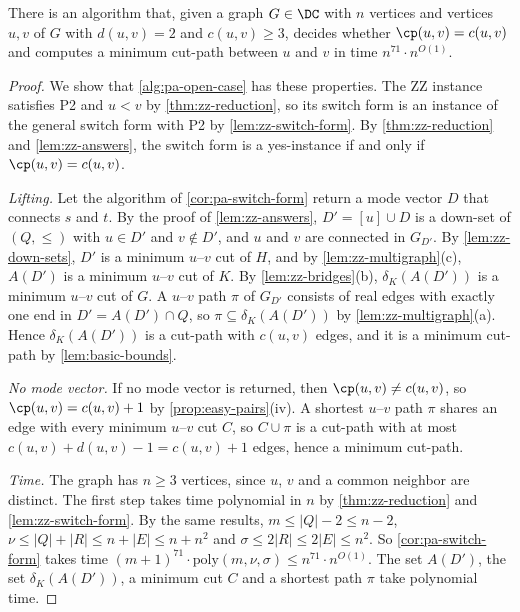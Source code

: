 \begin{theorem}
\label{thm:pa-open-case}
There is an algorithm that, given a graph $G \in \DC$ with $n$ vertices and vertices $u, v$ of $G$ with $d(u, v) = 2$ and $c(u, v) \geq 3$, decides whether $\cp(u, v) = c(u, v)$ and computes a minimum cut-path between $u$ and $v$ in time $n^{71} \cdot n^{O(1)}$.
\end{theorem}

\begin{proof}
We show that \cref{alg:pa-open-case} has these properties.
The ZZ instance satisfies P2 and $u < v$ by \cref{thm:zz-reduction}, so its switch form is an instance of the general switch form with P2 by \cref{lem:zz-switch-form}.
By \cref{thm:zz-reduction} and \cref{lem:zz-answers}, the switch form is a yes-instance if and only if $\cp(u, v) = c(u, v)$.

\emph{Lifting.}
Let the algorithm of \cref{cor:pa-switch-form} return a mode vector $D$ that connects $s$ and $t$.
By the proof of \cref{lem:zz-answers}, $D' = [u] \cup D$ is a down-set of $(Q, \leq)$ with $u \in D'$ and $v \notin D'$, and $u$ and $v$ are connected in $G_{D'}$.
By \cref{lem:zz-down-sets}, $D'$ is a minimum $u$--$v$ cut of $H$, and by \cref{lem:zz-multigraph}(c), $A(D')$ is a minimum $u$--$v$ cut of $K$.
By \cref{lem:zz-bridges}(b), $\delta_K(A(D'))$ is a minimum $u$--$v$ cut of $G$.
A $u$--$v$ path $\pi$ of $G_{D'}$ consists of real edges with exactly one end in $D' = A(D') \cap Q$, so $\pi \subseteq \delta_K(A(D'))$ by \cref{lem:zz-multigraph}(a).
Hence $\delta_K(A(D'))$ is a cut-path with $c(u, v)$ edges, and it is a minimum cut-path by \cref{lem:basic-bounds}.

\emph{No mode vector.}
If no mode vector is returned, then $\cp(u, v) \neq c(u, v)$, so $\cp(u, v) = c(u, v) + 1$ by \cref{prop:easy-pairs}(iv).
A shortest $u$--$v$ path $\pi$ shares an edge with every minimum $u$--$v$ cut $C$, so $C \cup \pi$ is a cut-path with at most $c(u, v) + d(u, v) - 1 = c(u, v) + 1$ edges, hence a minimum cut-path.

\emph{Time.}
The graph has $n \geq 3$ vertices, since $u$, $v$ and a common neighbor are distinct.
The first step takes time polynomial in $n$ by \cref{thm:zz-reduction} and \cref{lem:zz-switch-form}.
By the same results, $m \leq |Q| - 2 \leq n - 2$, $\nu \leq |Q| + |R| \leq n + |E| \leq n + n^2$ and $\sigma \leq 2|R| \leq 2|E| \leq n^2$.
So \cref{cor:pa-switch-form} takes time $(m + 1)^{71} \cdot \mathrm{poly}(m, \nu, \sigma) \leq n^{71} \cdot n^{O(1)}$.
The set $A(D')$, the set $\delta_K(A(D'))$, a minimum cut $C$ and a shortest path $\pi$ take polynomial time.
\end{proof}
